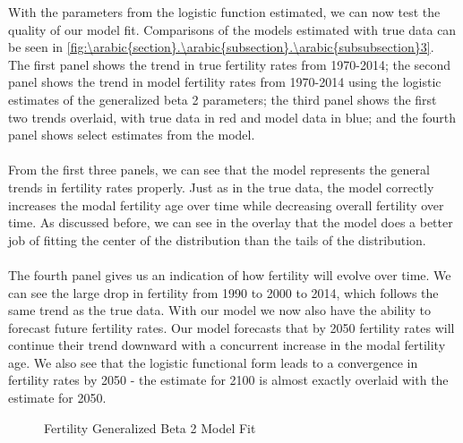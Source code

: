 \documentclass[10pt]{article}
\renewcommand{\thesection}{\arabic{section}}
\renewcommand{\thesubsection}{\thesection.\arabic{subsection}}
\renewcommand{\thesubsubsection}{\thesubsection.\arabic{subsubsection}}
\numberwithin{equation}{subsection}
\newcommand*{\FigureDir}{../../graphs}
\begin{document}
\begin{appendices}
\noindent
With the parameters from the logistic function estimated, we can now test the quality of our model fit. Comparisons of the models estimated with true data can be seen in \autoref{fig:\thesubsubsection3}. The first panel shows the trend in true fertility rates from 1970-2014; the second panel shows the trend in model fertility rates from 1970-2014 using the logistic estimates of the generalized beta 2 parameters; the third panel shows the first two trends overlaid, with true data in red and model data in blue; and the fourth panel shows select estimates from the model.
\\\\
From the first three panels, we can see that the model represents the general trends in fertility rates properly. Just as in the true data, the model correctly increases the modal fertility age over time while decreasing overall fertility over time. As discussed before, we can see in the overlay that the model does a better job of fitting the center of the distribution than the tails of the distribution.
\\\\
The fourth panel gives us an indication of how fertility will evolve over time. We can see the large drop in fertility from 1990 to 2000 to 2014, which follows the same trend as the true data. With our model we now also have the ability to forecast future fertility rates. Our model forecasts that by 2050 fertility rates will continue their trend downward with a concurrent increase in the modal fertility age. We also see that the logistic functional form leads to a convergence in fertility rates by 2050 - the estimate for 2100 is almost exactly overlaid with the estimate for 2050.

\begin{figure}[H]
   \centering
   \caption{\label{fig:\thesubsubsection3}Fertility Generalized Beta 2 Model Fit}
\end{figure}


\end{appendices}
\end{document}
